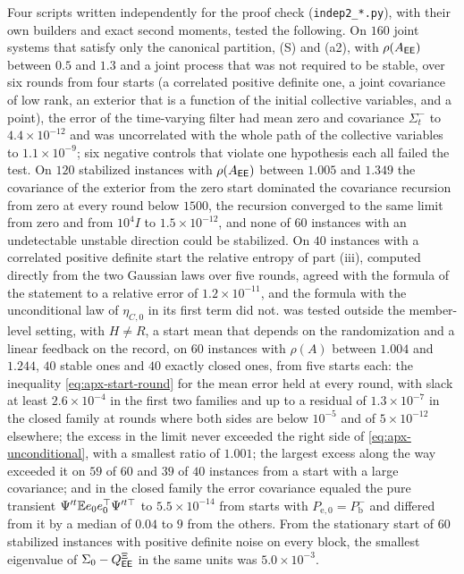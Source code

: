 \begin{numcheck}
Four scripts written independently for the proof check (\texttt{indep2\_*.py}), with their own builders and exact second moments, tested the following. On $160$ joint systems that satisfy only the canonical partition, (S) and (a2), with $\rho(A_{\mathsf{E}\mathsf{E}})$ between $0.5$ and $1.3$ and a joint process that was not required to be stable, over six rounds from four starts (a correlated positive definite one, a joint covariance of low rank, an exterior that is a function of the initial collective variables, and a point), the error of the time-varying filter had mean zero and covariance $\Sigma^-_t$ to $4.4\times10^{-12}$ and was uncorrelated with the whole path of the collective variables to $1.1\times10^{-9}$; six negative controls that violate one hypothesis each all failed the test. On $120$ stabilized instances with $\rho(A_{\mathsf{E}\mathsf{E}})$ between $1.005$ and $1.349$ the covariance of the exterior from the zero start dominated the covariance recursion from zero at every round below $1500$, the recursion converged to the same limit from zero and from $10^4I$ to $1.5\times10^{-12}$, and none of $60$ instances with an undetectable unstable direction could be stabilized. On $40$ instances with a correlated positive definite start the relative entropy of part (iii), computed directly from the two Gaussian laws over five rounds, agreed with the formula of the statement to a relative error of $1.2\times10^{-11}$, and the formula with the unconditional law of $\eta_{C,0}$ in its first term did not.  was tested outside the member-level setting, with $H\ne R$, a start mean that depends on the randomization and a linear feedback on the record, on $60$ instances with $\rho(A)$ between $1.004$ and $1.244$, $40$ stable ones and $40$ exactly closed ones, from five starts each: the inequality \cref{eq:apx-start-round} for the mean error held at every round, with slack at least $2.6\times10^{-4}$ in the first two families and up to a residual of $1.3\times10^{-7}$ in the closed family at rounds where both sides are below $10^{-5}$ and of $5\times10^{-12}$ elsewhere; the excess in the limit never exceeded the right side of \cref{eq:apx-unconditional}, with a smallest ratio of $1.001$; the largest excess along the way exceeded it on $59$ of $60$ and $39$ of $40$ instances from a start with a large covariance; and in the closed family the error covariance equaled the pure transient $\Psi'^t\mathbb{E} e_0e_0^\top\Psi'^{t\top}$ to $5.5\times10^{-14}$ from starts with $P_{\mathrm e,0}=P^-_{\mathrm b}$ and differed from it by a median of $0.04$ to $9$ from the others. From the stationary start of $60$ stabilized instances with positive definite noise on every block, the smallest eigenvalue of $\Sigma_0-Q^{\Xi}_{\mathsf{E}\mathsf{E}}$ in the same units was $5.0\times10^{-3}$.
\end{numcheck}

